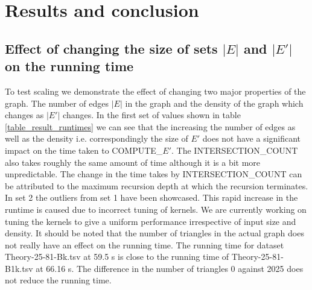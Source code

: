 \documentclass[conference]{IEEEtran}
\begin{document}
\section{Results and conclusion}
\subsection{Effect of changing the size of sets $|E|$ and $|E'|$ on the running time}
To test scaling we demonstrate the effect of changing two major properties of the graph. The number of edges $|E|$ in the graph and the density of the graph which changes as $|E'|$ changes. In the first set of values shown in table \ref{table_result_runtimes} we can see that the increasing the number of edges as well as the density i.e. correspondingly the size of $E'$ does not have a significant impact on the time taken to COMPUTE\_$E'$. The INTERSECTION\_COUNT also takes roughly the same amount of time although it is a bit more unpredictable. The change in the time takes by INTERSECTION\_COUNT can be attributed to the maximum recursion depth at which the recursion terminates. In set 2 the outliers from set 1 have been showcased. This rapid increase in the runtime is caused due to incorrect tuning of kernels. We are currently working on tuning the kernels to give a uniform performance irrespective of input size and density. It should be noted that the number of triangles in the actual graph does not really have an effect on the running time. The running time for dataset Theory-25-81-Bk.tsv at 59.5 s is close to the running time of Theory-25-81-B1k.tsv at 66.16 s. The difference in the number of triangles 0 against 2025 does not reduce the running time.
\end{document}
